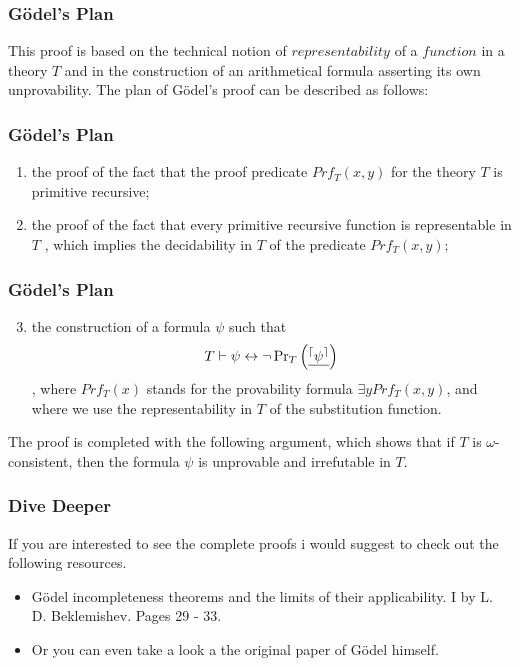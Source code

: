 \documentclass[aspectratio=169]{beamer}
\begin{document}
\begin{frame}
	\frametitle{Gödel's Plan}
	This proof is based on the technical notion of $representability$ of a $function$ in a theory $T$ and in the construction of an arithmetical formula asserting its own unprovability. The plan of Gödel's proof can be described as follows: \cite{bekl}
\end{frame}

\begin{frame}
	\frametitle{Gödel's Plan}
	\begin{enumerate}
		\item the proof of the fact that the proof predicate $Prf_T (x, y) $ for the theory $T$ is primitive recursive;
		\item the proof of the fact that every primitive recursive function is representable in $T$ , which implies the decidability in $T$ of the predicate $Prf_T (x, y);$
	\end{enumerate}
\end{frame}

\begin{frame}
	\frametitle{Gödel's Plan}
	\begin{enumerate}
	\setcounter{enumi}{2}
		\item the construction of a formula $\psi$ such that
		\[ T \vdash \psi \leftrightarrow \neg \operatorname{Pr}_{T}\left(\text{\underline{$^{\lceil} \psi^{\rceil}$}}\right) \]
		, where $Prf_T(x)$ stands for the provability formula $\exists y Prf_{T}(x, y)$, and where we
		use the representability in $T$ of the substitution function.
	\end{enumerate}
	The proof is completed with the following argument, which shows that if $T$ is $\omega$-consistent, then the formula $\psi$ is unprovable and irrefutable in $T$.
	\begin{flushright}
		\cite{bekl}
	\end{flushright}
\end{frame}

\begin{frame}
	\frametitle{Dive Deeper}
	If you are interested to see the complete proofs i would suggest to check out the following resources.
	\begin{itemize}
		\item Gödel incompleteness theorems and the limits of their applicability. I by L. D. Beklemishev. Pages 29 - 33. \cite{bekl}
		\item Or you can even take a look a the original paper of Gödel himself. \cite{godel}  
	\end{itemize}
\end{frame}
\end{document}
